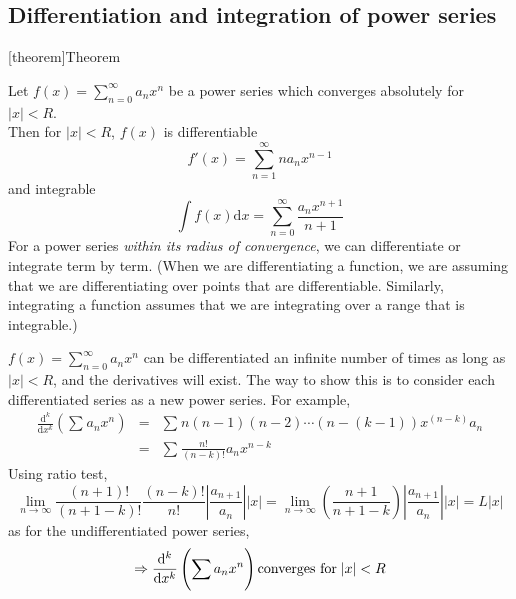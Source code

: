 \documentclass[12pt]{report}
\theoremstyle{definition}
\begin{document}
\subsection{Differentiation and integration of power series}
[theorem]{Theorem}
\begin{diff and int of power series}
    Let $f(x) = \sum_{n=0}^{\infty} a_n x^{n}$ be a power series which converges absolutely for $|x| < R$.
    \\Then for $|x| < R$, $f(x)$ is differentiable\[
        f'(x) = \sum_{n=1}^{\infty} n a_n x^{n-1}
    \]and integrable\[
    \int f(x)\mathrm{d}x = \sum_{n=0}^{\infty} \frac{a_n x^{n+1}}{n+1}
    \]
    For a power series \emph{within its radius of convergence}, we can differentiate or integrate term by term.
    (When we are differentiating a function, we are assuming that we are
    differentiating over points that are differentiable. Similarly,
    integrating a function assumes that we are integrating over a range
    that is integrable.)
\end{diff and int of power series}
\begin{notes}
    $f(x) = \sum_{n=0}^{\infty} a_n x^{n}$ can be differentiated an infinite number of times as long as $|x| < R$, 
    and the derivatives will exist.
    The way to show this is to consider each differentiated series as a new power series. For example,
    \begin{eqnarray*}
        \frac{\mathrm{d}^{k}}{\mathrm{d}x^{k}} \left(\sum_{}^{} a_n x^{n}\right)
        &=& \sum_{}^{} n(n-1)(n-2)\cdots(n-(k-1))x^{(n-k)}a_n \\
        &=& \sum_{}^{} \frac{n!}{(n-k)!} a_n x^{n-k}
    \end{eqnarray*}
    Using ratio test,\[
        \lim_{n\rightarrow\infty} \frac{(n+1)!}{(n+1-k)!} \frac{(n-k)!}{n!} \left|\frac{a_{n+1}}{a_n}\right| |x|
        = \lim_{n\rightarrow\infty} \left(\frac{n+1}{n+1-k}\right) \left|\frac{a_{n+1}}{a_n}\right| |x|
        = L|x|
    \]as for the undifferentiated power series,\[
    \Rightarrow \frac{\mathrm{d}^{k}}{\mathrm{d}x^{k}} \left(\sum_{}^{} a_n x^{n}\right) 
    \textnormal{converges for} \;|x| < R
    \]
\end{notes}
\end{document}
